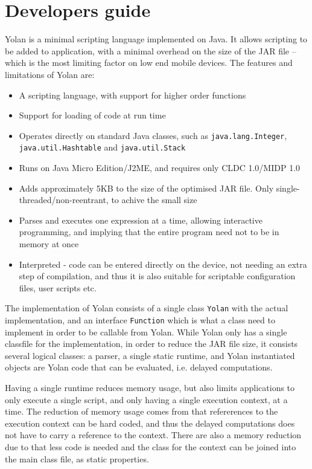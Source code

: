 \documentclass[11pt]{report}
\begin{document}
\section{Developers guide}
Yolan is a minimal scripting language implemented on Java.
It allows scripting to be added to application, with a minimal overhead on the size of the JAR file -- which is the most limiting factor on low end mobile devices. The features and limitations of Yolan are:
\begin{itemize}
\item A scripting language, with support for higher order functions
\item Support for loading of code at run time
\item Operates directly on standard Java classes, such as \verb|java.lang.Integer|, \verb|java.util.Hashtable| and \verb|java.util.Stack|
\item Runs on Java Micro Edition/J2ME, and requires only CLDC 1.0/MIDP 1.0
\item Adds approximately 5KB to the size of the optimised JAR file. Only single-threaded/non-reentrant, to achive the small size
\item Parses and executes one expression at a time, allowing interactive programming, and implying that the entire program need not to be in memory at once
\item Interpreted - code can be entered directly on the device, not needing an extra step of compilation, and thus it is also suitable for scriptable configuration files, user scripts etc.
\end{itemize}

The implementation of Yolan consists of a single class \verb|Yolan| with the actual implementation, and an interface \verb|Function| which is what a class need to implement in order to be callable from Yolan.
While Yolan only has a single classfile for the implementation, in order to reduce the JAR file size, it consists several logical classes: a parser, a single static runtime, and Yolan instantiated objects are Yolan code that can be evaluated, i.e. delayed computations.

Having a single runtime reduces memory usage, but also limits applications to only execute a single script, and only having a single execution context, at a time. The reduction of memory usage comes from that refererences to the execution context can be hard coded, and thus the delayed computations does not have to carry a reference to the context. There are also a memory reduction due to that less code is needed and the class for the context can be joined into the main class file, as static properties.
\end{document}
